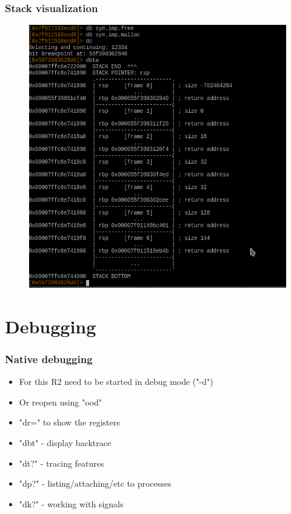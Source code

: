\documentclass[10pt,pdf,utf8,english,compress,hyperref={unicode}]{beamer}
\begin{document}
\begin{frame}[fragile]
	\frametitle{Stack visualization}
	\begin{figure}
		\includegraphics[width=\linewidth]{r2visualstack.png}
	\end{figure}
\end{frame}

\section{Debugging}

\begin{frame}[fragile]
  \frametitle{Native debugging}
  \begin{itemize}
	  \item For this R2 need to be started in debug mode ("-d")
	  \item Or reopen using "ood"
	  \item "dr=" to show the registers
	  \item "dbt" - display backtrace
	  \item "dt?" - tracing features
	  \item "dp?" - listing/attaching/etc to processes
	  \item "dk?" - working with signals
  \end{itemize}
\end{frame}
\end{document}
